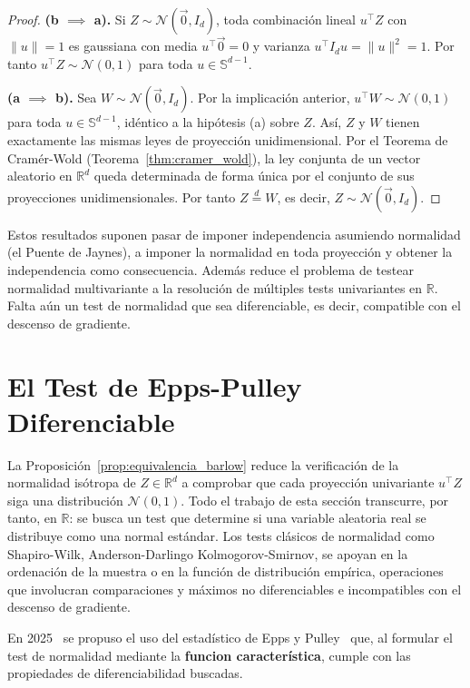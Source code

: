 \begin{proof}
\textbf{(b $\implies$ a).}
Si $Z \sim \mathcal{N}(\vec 0, I_d)$, toda combinación lineal $u^\top Z$ con $\|u\|=1$ es gaussiana con media $u^\top \vec 0 = 0$ y varianza $u^\top I_d u = \|u\|^2 = 1$. Por tanto $u^\top Z \sim \mathcal{N}(0,1)$ para toda $u\in\mathbb{S}^{d-1}$.

\textbf{(a $\implies$ b).}
Sea $W \sim \mathcal{N}(\vec 0, I_d)$. Por la implicación anterior, $u^\top W \sim \mathcal{N}(0,1)$ para toda $u\in\mathbb{S}^{d-1}$, idéntico a la hipótesis (a) sobre $Z$. Así, $Z$ y $W$ tienen exactamente las mismas leyes de proyección unidimensional. Por el Teorema de Cramér-Wold (Teorema~\ref{thm:cramer_wold}), la ley conjunta de un vector aleatorio en $\mathbb{R}^d$ queda determinada de forma única por el conjunto de sus proyecciones unidimensionales. Por tanto $Z \stackrel{d}{=} W$, es decir, $Z \sim \mathcal{N}(\vec 0, I_d)$.
\end{proof}
Estos resultados suponen pasar de imponer independencia asumiendo normalidad (el Puente de Jaynes), a imponer la normalidad en toda proyección y obtener la independencia como consecuencia. Además reduce el problema de testear normalidad multivariante a la resolución de múltiples tests univariantes en $\mathbb{R}$. Falta aún un test de normalidad que sea diferenciable, es decir, compatible con el descenso de gradiente.

\section{El Test de Epps-Pulley Diferenciable}
\label{sec:epps_pulley}

La Proposición~\ref{prop:equivalencia_barlow} reduce la verificación de la normalidad isótropa de $Z \in \mathbb{R}^d$ a comprobar que cada proyección univariante $u^\top Z$ siga una distribución $\mathcal{N}(0,1)$. Todo el trabajo de esta sección transcurre, por tanto, en $\mathbb{R}$: se busca un test que determine si una variable aleatoria real se distribuye como una normal estándar. Los tests clásicos de normalidad como Shapiro-Wilk, Anderson-Darlingo Kolmogorov-Smirnov, se apoyan en la ordenación de la muestra o en la función de distribución empírica, operaciones que involucran comparaciones y máximos no diferenciables e incompatibles con el descenso de gradiente.

En 2025~\cite{balestriero2025lejepa} se propuso el uso del estadístico de Epps y Pulley~\cite{epps1983test} que, al formular el test de normalidad mediante la \textbf{funcion característica}, cumple con las propiedades de diferenciabilidad buscadas. 


